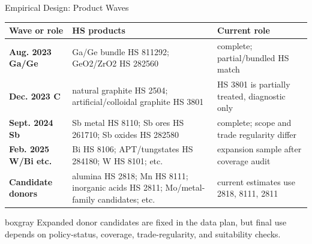 \documentclass[aspectratio=169,11pt]{beamer}
\renewcommand{\arraystretch}{1.13}
\newcommand{\plainbox}[2]{%
  \begin{beamercolorbox}[rounded=true,sep=0.48em,wd=\textwidth]{#1}
    #2
  \end{beamercolorbox}
}
\begin{document}
\begin{frame}{Empirical Design: Product Waves}
  \footnotesize
  \begingroup
  \setlength{\tabcolsep}{3pt}
  \renewcommand{\arraystretch}{1.02}
  \begin{tabularx}{\textwidth}{>{\raggedright\arraybackslash\bfseries}p{}>{\raggedright\arraybackslash}p{}>{\raggedright\arraybackslash}X}
    \toprule
    Wave or role & HS products & Current role \\
    \midrule
    Aug. 2023 Ga/Ge & Ga/Ge bundle HS 811292; GeO2/ZrO2 HS 282560 & complete; partial/bundled HS match \\
    Dec. 2023 C & natural graphite HS 2504; artificial/colloidal graphite HS 3801 & HS 3801 is partially treated, diagnostic only \\
    Sept. 2024 Sb & Sb metal HS 8110; Sb ores HS 261710; Sb oxides HS 282580 & complete; scope and trade regularity differ \\
    Feb. 2025 W/Bi etc. & Bi HS 8106; APT/tungstates HS 284180; W HS 8101; etc. & expansion sample after coverage audit \\
    Candidate donors & alumina HS 2818; Mn HS 8111; inorganic acids HS 2811; Mo/metal-family candidates; etc. & current estimates use 2818, 8111, 2811 \\
    \bottomrule
  \end{tabularx}
  \endgroup

  \vspace{0.05cm}
  \plainbox{boxgray}{%
    \scriptsize Expanded donor candidates are fixed in the data plan, but final use depends on policy-status, coverage, trade-regularity, and suitability checks.
  }
\end{frame}
\end{document}
